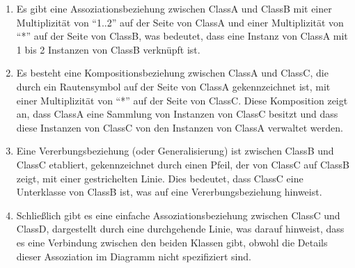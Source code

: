\begin{enumerate}
    \item Es gibt eine Assoziationsbeziehung zwischen ClassA und ClassB mit einer Multiplizität von ``1..2'' auf der
Seite von ClassA und einer Multiplizität von ``*'' auf der Seite von ClassB, was bedeutet, dass eine Instanz von ClassA
mit 1 bis 2 Instanzen von ClassB verknüpft ist.
    \item Es besteht eine Kompositionsbeziehung zwischen ClassA und ClassC, die durch ein Rautensymbol auf der Seite von
ClassA gekennzeichnet ist, mit einer Multiplizität von ``*'' auf der Seite von ClassC. Diese Komposition zeigt an, dass
ClassA eine Sammlung von Instanzen von ClassC besitzt und dass diese Instanzen von ClassC von den Instanzen von ClassA
verwaltet werden.
    \item Eine Vererbungsbeziehung (oder Generalisierung) ist zwischen ClassB und ClassC etabliert, gekennzeichnet durch
einen Pfeil, der von ClassC auf ClassB zeigt, mit einer gestrichelten Linie. Dies bedeutet, dass ClassC eine Unterklasse
von ClassB ist, was auf eine Vererbungsbeziehung hinweist.
    \item Schließlich gibt es eine einfache Assoziationsbeziehung zwischen ClassC und ClassD, dargestellt durch eine
durchgehende Linie, was darauf hinweist, dass es eine Verbindung zwischen den beiden Klassen gibt, obwohl die Details
dieser Assoziation im Diagramm nicht spezifiziert sind.
\end{enumerate}


